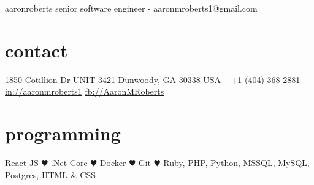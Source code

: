 \documentclass[]{friggeri-cv} %
\begin{document}
\header
{aaron}{roberts}
{senior software engineer - aaronmroberts1@gmail.com}


\begin{aside} %
\section{contact}
1850 Cotillion Dr
UNIT 3421
Dunwoody, GA 30338
USA
~
+1 (404) 368 2881
~
\href{https://www.linkedin.com/in/aaronmroberts1/}{in://aaronmroberts1}
\href{https://www.facebook.com/AaronMRoberts}{fb://AaronMRoberts}
\section{programming}
React JS {\color{red} $\varheartsuit$}
.Net Core {\color{red} $\varheartsuit$}
Docker {\color{red} $\varheartsuit$}
Git {\color{red} $\varheartsuit$}
Ruby, PHP, Python, MSSQL, MySQL, Postgres, HTML \& CSS
\end{aside}

\end{document}
